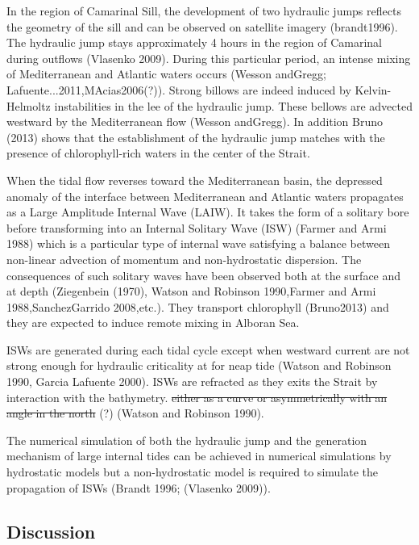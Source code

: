  \color{blue}In the region of Camarinal Sill, the \color{blue} development of two hydraulic jumps reflects the geometry of the sill and can be observed on satellite imagery (brandt1996). The hydraulic jump stays approximately 4 hours in the region of Camarinal during outflows (Vlasenko 2009). \color{blue} During this particular period, an intense mixing of Mediterranean and Atlantic waters occurs (Wesson andGregg; Lafuente...2011,MAcias2006(?)). \color{blue} Strong billows are indeed induced by \color{blue} Kelvin-Helmoltz instabilities in the lee of the hydraulic jump. These bellows are advected westward by the Mediterranean flow (Wesson andGregg). In addition Bruno (2013) shows that the establishment of the hydraulic jump matches with the presence of chlorophyll-rich waters in the center of the Strait. \color{black}

\color{blue}When the tidal flow reverses toward the Mediterranean basin, the depressed anomaly of the interface between Mediterranean and Atlantic waters propagates as a Large Amplitude Internal Wave (LAIW). It takes the form of a solitary bore before transforming into an Internal Solitary Wave (ISW) (Farmer and Armi 1988) which is a particular type of internal wave satisfying a balance between non-linear advection of momentum and non-hydrostatic dispersion. The consequences of such solitary waves \color{black} have been observed both at the surface and at depth (Ziegenbein (1970), Watson and Robinson 1990,Farmer and Armi 1988,SanchezGarrido 2008,etc.). They transport chlorophyll (Bruno2013) and \color{blue} they are expected to induce \color{black} remote mixing in Alboran Sea.

ISWs are generated during each tidal cycle except when westward current are not strong enough for hydraulic criticality at for neap tide (Watson and Robinson 1990, Garcia Lafuente 2000). \color{blue} ISWs are refracted as they exits the Strait by interaction with the bathymetry. \sout{either as a curve or asymmetrically with an angle in the north} (?) \color{black} (Watson and Robinson 1990).

 \color{blue}The numerical simulation of both the hydraulic jump and the generation mechanism of large internal tides can be achieved in numerical simulations by hydrostatic models but a non-hydrostatic model is required to simulate the propagation of ISWs (Brandt 1996; (Vlasenko 2009)). \color{black}



\subsection{Discussion}

